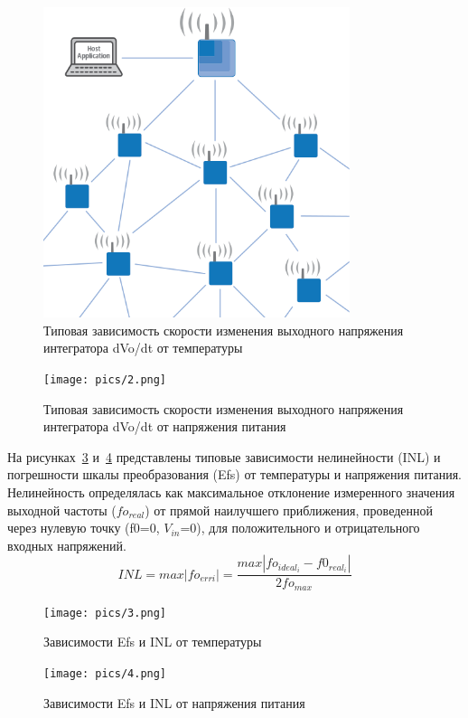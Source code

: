 \documentclass[a4paper,12pt,oneside]{scrartcl}
\begin{document}
\begin{figure}[!htb]
\centering
\includegraphics[width=0.8\textwidth]{pics/1.png}
\caption{Типовая зависимость скорости изменения выходного напряжения интегратора dVo/dt от температуры}
\label{fig:diagg1}
\end{figure}
\FloatBarrier

\begin{figure}[!htb]
\centering
\texttt{[image: pics/2.png]}
\caption{Типовая зависимость скорости изменения выходного напряжения интегратора dVo/dt от напряжения питания}
\label{fig:diagg2}
\end{figure}
\FloatBarrier

На рисунках~\ref{fig:diagg3} и~\ref{fig:diagg4} представлены типовые зависимости нелинейности (INL) и погрешности шкалы преобразования (Efs) от температуры и напряжения питания.
Нелинейность определялась как максимальное отклонение измеренного значения выходной частоты ($fo_{real}$) от прямой наилучшего приближения, проведенной через нулевую точку (f0=0, $V_{in}$=0), для положительного и отрицательного входных напряжений. 
$$INL = max |fo_{erri}| = \frac{max |fo_{ideal_{i}} - f0_{real_{i}}|}{2fo_{max}}$$

\begin{figure}[!htb]
\centering
\texttt{[image: pics/3.png]}
\caption{Зависимости Efs и INL от температуры}
\label{fig:diagg3}
\end{figure}
\FloatBarrier

\begin{figure}[!htb]
\centering
\texttt{[image: pics/4.png]}
\caption{Зависимости Efs и INL от напряжения питания}
\label{fig:diagg4}
\end{figure}
\FloatBarrier
\end{document}
